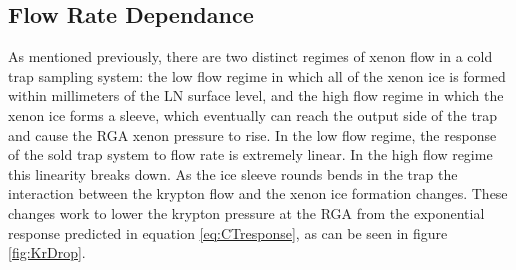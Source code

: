 \subsection{Flow Rate Dependance}
\label{sec:flow_real}
As mentioned previously, there are two distinct regimes of xenon flow in a cold trap sampling system: the low flow regime in which all of the xenon ice is formed within millimeters of the LN surface level, and the high flow regime in which the xenon ice forms a sleeve, which eventually can reach the output side of the trap and cause the RGA xenon pressure to rise. In the low flow regime, the response of the sold trap system to flow rate is extremely linear. In the high flow regime this linearity breaks down. As the ice sleeve rounds bends in the trap the interaction between the krypton flow and the xenon ice formation changes. These changes work to lower the krypton pressure at the RGA from the exponential response predicted in equation \ref{eq:CTresponse}, as can be seen in figure \ref{fig:KrDrop}.

